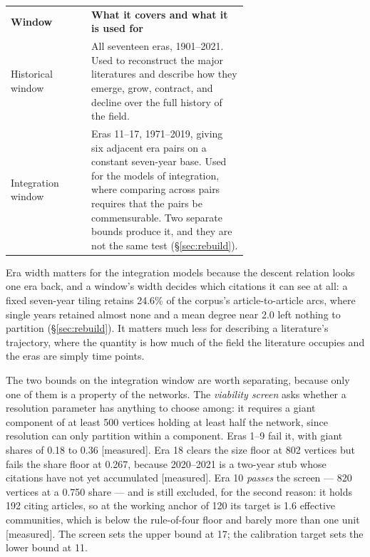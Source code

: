 \documentclass[11pt]{article}
\newcommand{\doublerule}{%
  \specialrule{\lightrulewidth}{0pt}{\doublerulesep}%
  \specialrule{\lightrulewidth}{0pt}{0pt}}
\newcommand{\meas}{{\footnotesize\textsf{[measured]}}}
\begin{document}
\begin{center}
\small
\begin{tabular}{@{}lp{0.66\linewidth}@{}}
\toprule
\textbf{Window} & \textbf{What it covers and what it is used for}\\
\doublerule
Historical window & All seventeen eras, 1901--2021. Used to reconstruct the major
                    literatures and describe how they emerge, grow, contract, and decline
                    over the full history of the field.\\[3pt]
Integration window & Eras 11--17, 1971--2019, giving six adjacent era pairs on a constant
                    seven-year base. Used for the models of integration, where comparing
                    across pairs requires that the pairs be commensurable. Two separate
                    bounds produce it, and they are not the same test
                    (\S\ref{sec:rebuild}).\\
\bottomrule
\end{tabular}
\end{center}

Era width matters for the integration models because the descent relation looks one era
back, and a window's width decides which citations it can see at all: a fixed seven-year
tiling retains 24.6\% of the corpus's article-to-article arcs, where single years retained
almost none and a mean degree near 2.0 left nothing to partition (\S\ref{sec:rebuild}).
It matters much less for describing a literature's trajectory, where the quantity is how
much of the field the literature occupies and the eras are simply time points.

The two bounds on the integration window are worth separating, because only one of them is
a property of the networks. The \emph{viability screen} asks whether a resolution parameter
has anything to choose among: it requires a giant component of at least 500 vertices holding
at least half the network, since resolution can only partition within a component. Eras 1--9
fail it, with giant shares of 0.18 to 0.36 \meas{}. Era 18 clears the size floor at 802
vertices but fails the share floor at 0.267, because 2020--2021 is a two-year stub whose
citations have not yet accumulated \meas{}. Era 10 \emph{passes} the screen --- 820 vertices
at a 0.750 share --- and is still excluded, for the second reason: it holds 192 citing
articles, so at the working anchor of 120 its target is 1.6 effective communities, which is
below the rule-of-four floor and barely more than one unit \meas{}. The screen sets the upper
bound at 17; the calibration target sets the lower bound at 11.
\end{document}
